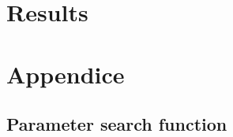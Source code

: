 \section{Results}\label{results}

\section{Appendice}\label{appendice}

\subsection{Parameter search function}\label{sec:search_func}

\begin{Shaded}
\begin{Highlighting}[]
  \OperatorTok{=} \NormalTok{(}\NormalTok{)}
 \OperatorTok{=} \OperatorTok{:}\OperatorTok{:}\OperatorTok{;}
 \OperatorTok{=} \OperatorTok{:}\OperatorTok{:}\OperatorTok{;}


\end{Highlighting}
\end{Shaded}
